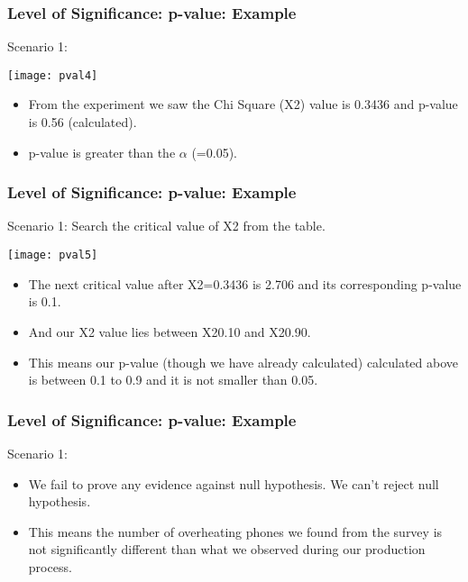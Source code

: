 \begin{frame}[fragile]\frametitle{Level of Significance: p-value: Example}
Scenario 1:

\begin{center}
\texttt{[image: pval4]}
\end{center}

\begin{itemize}
\item From the experiment we saw the Chi Square (X2) value is 0.3436 and p-value is 0.56 (calculated).
\item  p-value is greater than the $\alpha$ (=0.05).
\end{itemize}
\end{frame}

\begin{frame}[fragile]\frametitle{Level of Significance: p-value: Example}
Scenario 1:
Search the critical value of X2 from the table. 
\begin{center}
\texttt{[image: pval5]}
\end{center}

\begin{itemize}
\item The next critical value after X2=0.3436 is 2.706 and its corresponding p-value is 0.1. 
\item And our X2 value lies between X20.10 and X20.90. 
\item This means our p-value (though we have already calculated) calculated above is between 0.1 to 0.9 and it is not smaller than 0.05.
\end{itemize}
\end{frame}

\begin{frame}[fragile]\frametitle{Level of Significance: p-value: Example}
Scenario 1:
\begin{itemize}
\item We fail to prove any evidence against null hypothesis. We can’t reject null hypothesis. 
\item This means the number of overheating phones we found from the survey is not significantly different than what we observed during our production process.
\end{itemize}
\end{frame}

